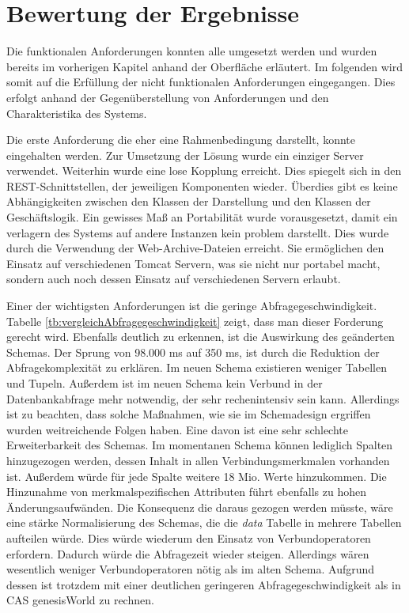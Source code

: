 \section{Bewertung der Ergebnisse}
\label{ch:Ergebnis:sec:bewertung}

Die funktionalen Anforderungen konnten alle umgesetzt werden und wurden bereits im vorherigen Kapitel anhand der Oberfläche erläutert. Im folgenden wird somit auf die Erfüllung der nicht funktionalen Anforderungen eingegangen. Dies erfolgt anhand der Gegenüberstellung von Anforderungen und den Charakteristika des Systems.

Die erste Anforderung die eher eine Rahmenbedingung darstellt, konnte eingehalten werden. Zur Umsetzung der Lösung wurde ein einziger Server verwendet. Weiterhin wurde eine lose Kopplung erreicht. Dies spiegelt sich in den REST-Schnittstellen, der jeweiligen Komponenten wieder. Überdies gibt es keine Abhängigkeiten zwischen den Klassen der Darstellung und den Klassen der Geschäftslogik. Ein gewisses Maß an Portabilität wurde vorausgesetzt, damit ein verlagern des Systems auf andere Instanzen kein problem darstellt. Dies wurde durch die Verwendung der Web-Archive-Dateien erreicht. Sie ermöglichen den Einsatz auf verschiedenen Tomcat Servern, was sie nicht nur portabel macht, sondern auch noch dessen Einsatz auf verschiedenen Servern erlaubt. 

Einer der wichtigsten Anforderungen ist die geringe Abfragegeschwindigkeit. Tabelle \ref{tb:vergleichAbfragegeschwindigkeit} zeigt, dass man dieser Forderung gerecht wird. Ebenfalls deutlich zu erkennen, ist die Auswirkung des geänderten Schemas. Der Sprung von 98.000 ms auf 350 ms, ist durch die Reduktion der Abfragekomplexität zu erklären. Im neuen Schema existieren weniger Tabellen und Tupeln. Außerdem ist im neuen Schema kein Verbund in der Datenbankabfrage mehr notwendig, der sehr rechenintensiv sein kann. Allerdings ist zu beachten, dass solche Maßnahmen, wie sie im Schemadesign ergriffen wurden weitreichende Folgen haben. Eine davon ist eine sehr schlechte Erweiterbarkeit des Schemas. Im momentanen Schema können lediglich Spalten hinzugezogen werden, dessen Inhalt in allen Verbindungsmerkmalen vorhanden ist. Außerdem würde für jede Spalte weitere 18 Mio. Werte hinzukommen. Die Hinzunahme von merkmalspezifischen Attributen führt ebenfalls zu hohen Änderungsaufwänden. Die Konsequenz die daraus gezogen werden müsste, wäre eine stärke Normalisierung des Schemas, die die \textit{data} Tabelle in mehrere Tabellen aufteilen würde. Dies würde wiederum den Einsatz von Verbundoperatoren erfordern. Dadurch würde die Abfragezeit wieder steigen. Allerdings wären wesentlich weniger Verbundoperatoren nötig als im alten Schema. Aufgrund dessen ist trotzdem mit einer deutlichen geringeren Abfragegeschwindigkeit als in CAS genesisWorld zu rechnen.  

